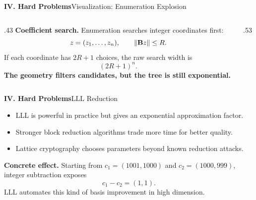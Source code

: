 \begin{frame}{\textbf{IV. Hard Problems}}{Visualization: Enumeration Explosion}
\small
\begin{columns}[T,onlytextwidth]
\begin{column}{.43\textwidth}
\textbf{Coefficient search.}\; Enumeration searches integer coordinates first:
\[
  z=(z_1,\ldots,z_n),\qquad \left\lVert \mathbf{B}z\right\rVert\le R.
\]
If each coordinate has $2R+1$ choices, the raw search width is
\[
  (2R+1)^n.
\]
\textbf{The geometry filters candidates, but the tree is still exponential.}
\end{column}
\begin{column}{.53\textwidth}
\begin{center}
\end{center}
\end{column}
\end{columns}
\end{frame}

\begin{frame}[shrink=8]{\textbf{IV. Hard Problems}}{LLL Reduction}
\begin{itemize}
  \item LLL is powerful in practice but gives an exponential approximation factor.
  \item Stronger block reduction algorithms trade more time for better quality.
  \item Lattice cryptography chooses parameters beyond known reduction attacks.
\end{itemize}
\textbf{Concrete effect.}\; Starting from $c_1=(1001,1000)$ and $c_2=(1000,999)$, integer subtraction exposes
\[
  c_1-c_2=(1,1).
\]
LLL automates this kind of basis improvement in high dimension.
\end{frame}

